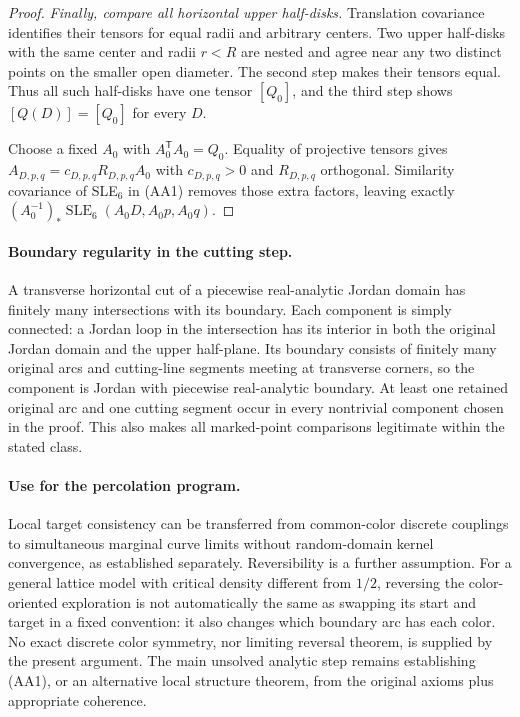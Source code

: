 \documentclass[11pt]{article}
\theoremstyle{definition}\newtheorem{definition}[theorem]{Definition}
\theoremstyle{remark}\newtheorem{remark}[theorem]{Remark}
\begin{document}
\begin{proof}
\emph{Finally, compare all horizontal upper half-disks.}
Translation covariance identifies their tensors for equal radii and arbitrary centers. Two upper half-disks with the same center and radii
$r<R$ are nested and agree near any two distinct points on the smaller open
diameter. The second step makes their tensors equal. Thus all such half-disks
have one tensor $[Q_0]$, and the third step shows $[Q(D)]=[Q_0]$ for every $D$.

Choose a fixed $A_0$ with $A_0^{\mathsf T}A_0=Q_0$. Equality of projective
tensors gives $A_{D,p,q}=c_{D,p,q}R_{D,p,q}A_0$ with $c_{D,p,q}>0$ and
$R_{D,p,q}$ orthogonal. Similarity covariance of SLE$_6$ in (AA1) removes
those extra factors, leaving exactly
$(A_0^{-1})_*\operatorname{SLE}_6(A_0D,A_0p,A_0q)$.
\end{proof}

\paragraph{Boundary regularity in the cutting step.}
A transverse horizontal cut of a piecewise real-analytic Jordan domain has finitely
many intersections with its boundary. Each component is simply connected:
a Jordan loop in the intersection has its interior in both the original
Jordan domain and the upper half-plane. Its boundary consists of finitely
many original arcs and cutting-line segments meeting at transverse corners,
so the component is Jordan with piecewise real-analytic boundary. At least one
retained original arc and one cutting segment occur in every nontrivial
component chosen in the proof. This also makes all marked-point comparisons
legitimate within the stated class.

\paragraph{Use for the percolation program.}
Local target consistency can be transferred from common-color discrete
couplings to simultaneous marginal curve limits without random-domain kernel
convergence, as established separately. Reversibility is a further assumption.
For a general lattice model with critical density different from $1/2$,
reversing the color-oriented exploration is not automatically the same as
swapping its start and target in a fixed convention: it also changes which
boundary arc has each color. No exact discrete color symmetry, nor limiting
reversal theorem, is supplied by the present argument.
The main unsolved analytic step remains establishing (AA1), or an alternative
local structure theorem, from the original axioms plus appropriate coherence.
\end{document}
